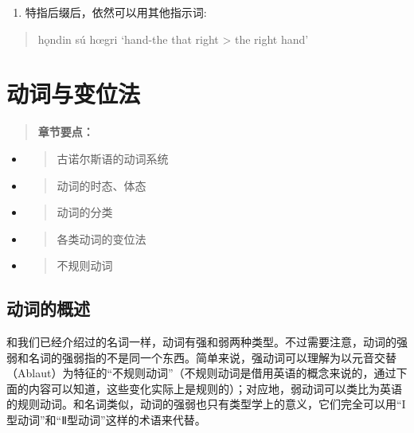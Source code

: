 \begin{enumerate}
  \def\labelenumi{\arabic{enumi})}
  \setcounter{enumi}{2}
  \item
        特指后缀后，依然可以用其他指示词:
\end{enumerate}

\begin{quote}
  hǫndin sú hœgri `hand-the that right \textgreater{} the right hand'
\end{quote}

\section{动词与变位法}\label{动词与变位法}

\begin{quote}
  \textbf{章节要点：}
\end{quote}

\begin{itemize}
  \item
        \begin{quote}
          古诺尔斯语的动词系统
        \end{quote}
  \item
        \begin{quote}
          动词的时态、体态
        \end{quote}
  \item
        \begin{quote}
          动词的分类
        \end{quote}
  \item
        \begin{quote}
          各类动词的变位法
        \end{quote}
  \item
        \begin{quote}
          不规则动词
        \end{quote}
\end{itemize}

\subsection{动词的概述}\label{动词的概述}

和我们已经介绍过的名词一样，动词有强和弱两种类型。不过需要注意，动词的强弱和名词的强弱指的不是同一个东西。简单来说，强动词可以理解为以元音交替（Ablaut）为特征的``不规则动词''（不规则动词是借用英语的概念来说的，通过下面的内容可以知道，这些变化实际上是规则的）；对应地，弱动词可以类比为英语的规则动词。和名词类似，动词的强弱也只有类型学上的意义，它们完全可以用``I型动词''和``Ⅱ型动词''这样的术语来代替。

